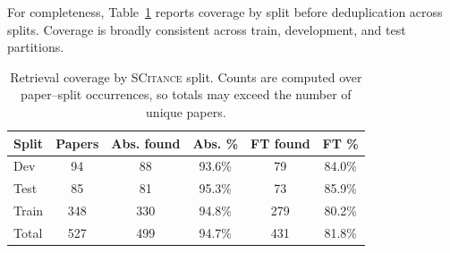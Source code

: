 \documentclass{article}
\theoremstyle{plain}
\theoremstyle{definition}
\theoremstyle{remark}
\begin{document}
For completeness, Table~\ref{tab:retrieval_split_app} reports coverage by split before deduplication across splits. Coverage is broadly consistent across train, development, and test partitions.

\begin{table}[H]
\centering
\small
\caption{Retrieval coverage by \textsc{SCitance} split. Counts are computed over paper--split occurrences, so totals may exceed the number of unique papers.}
\label{tab:retrieval_split_app}
\begin{tabular}{lccccc}
\toprule
\textbf{Split} & \textbf{Papers} & \textbf{Abs. found} & \textbf{Abs. \%} & \textbf{FT found} & \textbf{FT \%} \\
\midrule
Dev & 94 & 88 & 93.6\% & 79 & 84.0\% \\
Test & 85 & 81 & 95.3\% & 73 & 85.9\% \\
Train & 348 & 330 & 94.8\% & 279 & 80.2\% \\
\midrule
Total & 527 & 499 & 94.7\% & 431 & 81.8\% \\
\bottomrule
\end{tabular}
\end{table}
\end{document}
